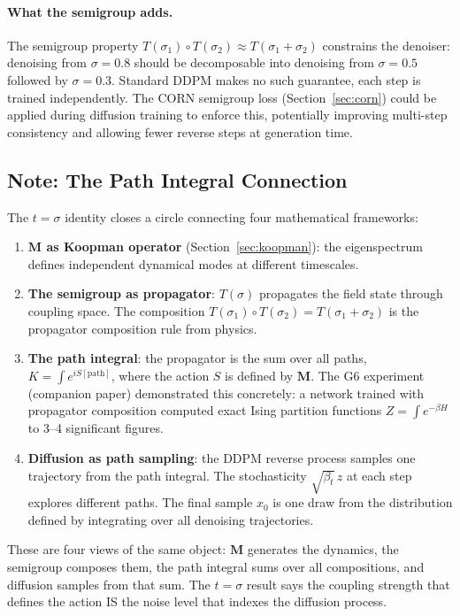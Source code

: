 \documentclass[11pt, a4paper]{article}
\newcommand{\M}{\mathbf{M}}
\theoremstyle{plain}
\theoremstyle{remark}
\begin{document}
\paragraph{What the semigroup adds.}
The semigroup property $T(\sigma_1) \circ T(\sigma_2) \approx T(\sigma_1 + \sigma_2)$ constrains the denoiser: denoising from $\sigma{=}0.8$ should be decomposable into denoising from $\sigma{=}0.5$ followed by $\sigma{=}0.3$.
Standard DDPM makes no such guarantee, each step is trained independently.
The CORN semigroup loss (Section~\ref{sec:corn}) could be applied during diffusion training to enforce this, potentially improving multi-step consistency and allowing fewer reverse steps at generation time.

\subsection{Note: The Path Integral Connection}

The $t{=}\sigma$ identity closes a circle connecting four mathematical frameworks:

\begin{enumerate}[nosep]
    \item \textbf{$\M$ as Koopman operator} (Section~\ref{sec:koopman}): the eigenspectrum defines independent dynamical modes at different timescales.
    \item \textbf{The semigroup as propagator}: $T(\sigma)$ propagates the field state through coupling space.  The composition $T(\sigma_1) \circ T(\sigma_2) = T(\sigma_1{+}\sigma_2)$ is the propagator composition rule from physics.
    \item \textbf{The path integral}: the propagator is the sum over all paths, $K = \int e^{iS[\text{path}]}$, where the action $S$ is defined by $\M$.  The G6 experiment (companion paper) demonstrated this concretely: a network trained with propagator composition computed exact Ising partition functions $Z = \int e^{-\beta H}$ to 3--4 significant figures.
    \item \textbf{Diffusion as path sampling}: the DDPM reverse process samples one trajectory from the path integral.  The stochasticity $\sqrt{\beta_t}\,z$ at each step explores different paths.  The final sample $x_0$ is one draw from the distribution defined by integrating over all denoising trajectories.
\end{enumerate}

These are four views of the same object: $\M$ generates the dynamics, the semigroup composes them, the path integral sums over all compositions, and diffusion samples from that sum.  The $t{=}\sigma$ result says the coupling strength that defines the action IS the noise level that indexes the diffusion process.
\end{document}
